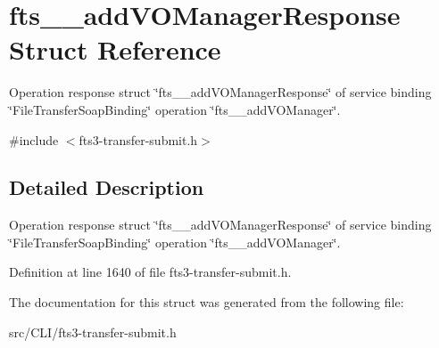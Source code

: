 \section{fts\_\-\_\-addVOManagerResponse Struct Reference}
\label{structfts____addVOManagerResponse}


Operation response struct \char`\"{}fts\_\-\_\-addVOManagerResponse\char`\"{} of service binding \char`\"{}FileTransferSoapBinding\char`\"{} operation \char`\"{}fts\_\-\_\-addVOManager\char`\"{}.  




{\ttfamily \#include $<$fts3-\/transfer-\/submit.h$>$}



\subsection{Detailed Description}
Operation response struct \char`\"{}fts\_\-\_\-addVOManagerResponse\char`\"{} of service binding \char`\"{}FileTransferSoapBinding\char`\"{} operation \char`\"{}fts\_\-\_\-addVOManager\char`\"{}. 

Definition at line 1640 of file fts3-\/transfer-\/submit.h.



The documentation for this struct was generated from the following file:\begin{DoxyCompactItemize}
\item 
src/CLI/fts3-\/transfer-\/submit.h\end{DoxyCompactItemize}
